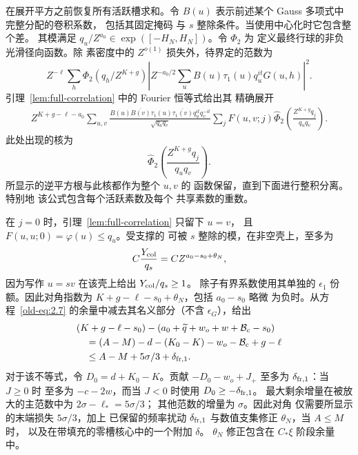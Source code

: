 在展开平方之前恢复所有活跃槽求和。令
\(B(u)\) 表示前述某个 Gauss 多项式中完整分配的卷积系数，
包括其固定掩码
与 \(s\) 整除条件。当使用中心化时它包含整个差。
其模满足
\(q_u/Z^{a_0}\in\exp([-H_N,H_N])\)。令 \(\Phi_2\) 为
定义最终行球的非负光滑径向函数。除
素密度中的 \(Z^{o(1)}\) 损失外，待界定的范数为
\[
 Z^{-\ell}\sum_h\Phi_2(q_h/Z^{K+g})
 \left|Z^{-a_0/2}\sum_u B(u)\tau_1(u)q_u^{it}G(u,h)\right|^2.
\]
引理~\ref{lem:full-correlation} 中的 Fourier 恒等式给出其
精确展开
\[
 \begin{split}
 Z^{K+g-\ell-a_0}\sum_{u,v}
 \frac{B(u)\overline{B(v)}\tau_1(u)\overline{\tau_1(v)}
       q_u^{it}q_v^{-it}}{\sqrt{q_uq_v}}
 \sum_j F(u,v;j)
 \widehat\Phi_2\left(\frac{Z^{K+g}q_j}{q_uq_v}\right).
 \end{split}
\]
此处出现的核为
\begin{equation}
 \widehat\Phi_2\left(\frac{Z^{K+g}q_j}{q_uq_v}\right).
 \label{old-eq:2.18b}
\end{equation}
所显示的逆平方根与此核都作为整个 \(u,v\) 的
函数保留，直到下面进行整积分离。特别地
该公式包含每个活跃素数及每个
共享素数的重数。

在 \(j=0\) 时，引理~\ref{lem:full-correlation} 只留下 \(u=v\)，
且 \(F(u,u;0)=\varphi(u)\le q_u\)。受支撑的
可被 \(s\) 整除的模，在非空壳上，至多为
\[
 C\frac{Y_{\rm col}}{q_s}=C Z^{a_0-s_0+\theta_N},
\]
因为写作 \(u=sv\) 在该壳上给出 \(Y_{\rm col}/q_s\ge1\)。
除子有界系数使用其单独的 \(\epsilon_1\)
份额。因此对角指数为
\(K+g-\ell-s_0+\theta_N\)，包括 \(a_0-s_0\) 略微
为负时。从方程~\eqref{old-eq:2.7}
的余量中减去其名义部分（不含 \(\epsilon_G\)），给出
\begin{equation}
 \begin{split}
 &(K+g-\ell-s_0)
 -(a_0+\widetilde q+w_o+w+\mathcal B_c-s_0)\\
 &\quad=(A-M)-d-(K_0-K)-w_o-\mathcal B_c+g-\ell\\
 &\quad\le A-M+5\sigma/3+\delta_{{\rm fr},1}.
 \end{split}
 \label{old-eq:2.12}
\end{equation}
对于该不等式，令 \(D_0=d+K_0-K\)。贡献
\(-D_0-w_o+J_+\) 至多为 \(\delta_{{\rm fr},1}\)：当 \(J\ge0\) 时
至多为 \(-c-2w\)，而当 \(J<0\) 时使用
\(D_0\ge-\delta_{{\rm fr},1}\)。
最大剩余增量在被放大的主范数中为
\(2\sigma-\ell_*=5\sigma/3\)；
其他范数的增量为 \(\sigma\)。因此对角
仅需要所显示的末端损失 \(5\sigma/3\)，加上
已保留的频率扰动 \(\delta_{{\rm fr},1}\)
与数值支集修正 \(\theta_N\)，当 \(A\le M\) 时，
以及在带填充的零槽核心中的一个附加 \(\delta\)。
\(\theta_N\) 修正包含在 \(C_*\xi\) 阶段余量中。

